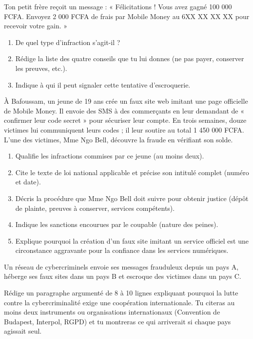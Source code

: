 \documentclass[11pt]{article}
\newcounter{popsec}
\newcounter{popsub}
\newcommand{\courssub}[1]{%
  \stepcounter{popsub}%
  \par\vspace{9pt}\noindent{\popxbold\fontsize{11.5}{13}\selectfont\color{popink}{\color{poporange}\thepopsec.\thepopsub}\hspace{6pt}#1}\par\nopagebreak\vspace{4pt}
}
\begin{document}
\begin{exercice}
Ton petit frère reçoit un message : « Félicitations ! Vous avez gagné 100 000 FCFA. Envoyez 2 000 FCFA de frais par Mobile Money au 6XX XX XX XX pour recevoir votre gain. »

\begin{enumerate}
\item De quel type d'infraction s'agit-il ?
\item Rédige la liste des quatre conseils que tu lui donnes (ne pas payer, conserver les preuves, etc.).
\item Indique à qui il peut signaler cette tentative d'escroquerie.
\end{enumerate}
\end{exercice}

\courssub{Je me prépare au BEPC}

\begin{exercice}
À Bafoussam, un jeune de 19 ans crée un faux site web imitant une page officielle de Mobile Money. Il envoie des SMS à des commerçants en leur demandant de « confirmer leur code secret » pour sécuriser leur compte. En trois semaines, douze victimes lui communiquent leurs codes ; il leur soutire au total 1 450 000 FCFA. L'une des victimes, Mme Ngo Bell, découvre la fraude en vérifiant son solde.

\begin{enumerate}
\item Qualifie les infractions commises par ce jeune (au moins deux).
\item Cite le texte de loi national applicable et précise son intitulé complet (numéro et date).
\item Décris la procédure que Mme Ngo Bell doit suivre pour obtenir justice (dépôt de plainte, preuves à conserver, services compétents).
\item Indique les sanctions encourues par le coupable (nature des peines).
\item Explique pourquoi la création d'un faux site imitant un service officiel est une circonstance aggravante pour la confiance dans les services numériques.
\end{enumerate}
\end{exercice}

\begin{exercice}
Un réseau de cybercriminels envoie ses messages frauduleux depuis un pays A, héberge ses faux sites dans un pays B et escroque des victimes dans un pays C.

Rédige un paragraphe argumenté de 8 à 10 lignes expliquant pourquoi la lutte contre la cybercriminalité exige une coopération internationale. Tu citeras au moins deux instruments ou organisations internationaux (Convention de Budapest, Interpol, RGPD) et tu montreras ce qui arriverait si chaque pays agissait seul.
\end{exercice}
\end{document}
